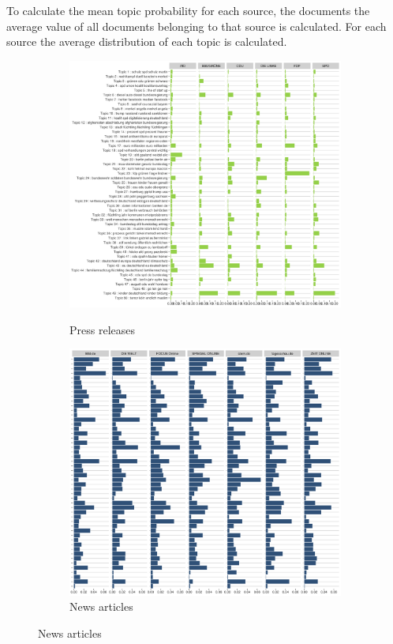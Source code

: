 \documentclass[12pt,a4paper,notitlepage]{article}
\begin{document}

To calculate the mean topic probability for each source, the documents the average value of all documents belonging to that source is calculated. 
For each source the average distribution of each topic is calculated. 

\begin{figure}[H]
	\begin{center}
	\caption{Term frequency}
		\begin{subfigure}[normla]{0.49\textwidth}
			\caption{Press releases}
			\includegraphics[width=\textwidth]{../figs/topic_proportion_press}
			\label{fig_tf_press}
		\end{subfigure}
		\begin{subfigure}[normla]{0.49\textwidth}
			\caption{News articles}
			\includegraphics[width=\textwidth]{../figs/topic_proportion_news}

\end{subfigure}
\end{center}
\end{figure}
\end{document}
